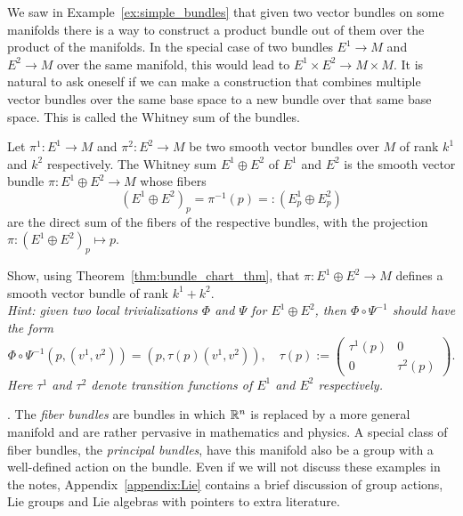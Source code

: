 We saw in Example~\ref{ex:simple_bundles} that given two vector bundles on some manifolds there is a way to construct a product bundle out of them over the product of the manifolds.
In the special case of two bundles $E^1 \to M$ and $E^2 \to M$ over the same manifold, this would lead to $E^1 \times E^2 \to M \times M$.
It is natural to ask oneself if we can make a construction that combines multiple vector bundles over the same base space to a new bundle over that same base space.
This is called the Whitney sum of the bundles.
\begin{exercise}\label{ex:whitney}
	Let $\pi^1 : E^1 \to M$ and $\pi^2 : E^2 \to M$ be two smooth vector bundles over $M$ of rank $k^1$ and $k^2$ respectively.
	The Whitney sum $E^1 \oplus E^2$ of $E^1$ and $E^2$ is the smooth vector bundle $\pi: E^1 \oplus E^2 \to M$ whose fibers
	\begin{equation}
		(E^1 \oplus E^2)_p = \pi^{-1}(p) =: (E^1_p \oplus E^2_p)
	\end{equation}
	are the direct sum of the fibers of the respective bundles, with the projection $\pi: (E^1\oplus E^2)_p \mapsto p$.

	Show, using Theorem~\ref{thm:bundle_chart_thm}, that $\pi: E^1 \oplus E^2 \to M$ defines a smooth vector bundle of rank $k^1 + k^2$.\\
	\textit{\small
		Hint: given two local trivializations $\varPhi$ and $\varPsi$ for $E^1\oplus E^2$, then $\varPhi\circ\varPsi^{-1}$ should have the form
		\begin{equation}
			\varPhi\circ\varPsi^{-1}(p, (v^1, v^2)) = (p, \tau(p)(v^1, v^2)), \quad
			\tau(p) :=
			\begin{pmatrix}
				\tau^1(p) & 0         \\
				0         & \tau^2(p)
			\end{pmatrix}.
		\end{equation}
		Here $\tau^1$ and $\tau^2$ denote transition functions of $E^1$ and $E^2$ respectively.
	}
\end{exercise}

.
The \emph{fiber bundles} are bundles in which $\mathbb{R}^n$ is replaced by a more general manifold and are rather pervasive in mathematics and physics.
A special class of fiber bundles, the \emph{principal bundles}, have this manifold also be a group with a well-defined action on the bundle.
Even if we will not discuss these examples in the notes, Appendix~\ref{appendix:Lie} contains a brief discussion of group actions, Lie groups and Lie algebras with pointers to extra literature.

